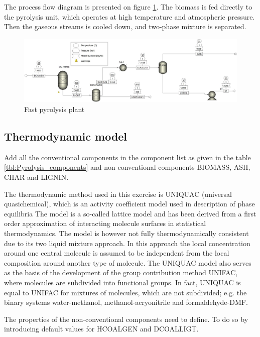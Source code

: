 The process flow diagram is presented on figure \ref{fig:Pyrolasis}. The biomass is fed directly to the pyrolysis unit, which operates at high temperature and atmospheric pressure. Then the gaseous streams is cooled down, and two-phase mixture is separated.

\begin{figure}[h!]
	\centering
	\includegraphics[width=\linewidth]{Figures/TchermochemicalProcesses/Pyrolysis.jpeg}
	\caption{Fast pyrolysis plant}
	\label{fig:Pyrolasis}
\end{figure}

\subsection{Thermodynamic model}
Add all the conventional components in the component list as given in the table \ref{tbl:Pyrolysis_components} and non-conventional components BIOMASS, ASH, CHAR and LIGNIN. 

The thermodynamic method used in this exercise is UNIQUAC (universal quasichemical), which is an activity coefficient model used in description of phase equilibria The model is a so-called lattice model and has been derived from a first order approximation of interacting molecule surfaces in statistical thermodynamics. The model is however not fully thermodynamically consistent due to its two liquid mixture approach. In this approach the local concentration around one central molecule is assumed to be independent from the local composition around another type of molecule. The UNIQUAC model also serves as the basis of the development of the group contribution method UNIFAC, where molecules are subdivided into functional groups. In fact, UNIQUAC is equal to UNIFAC for mixtures of molecules, which are not subdivided; e.g. the binary systems water-methanol, methanol-acryonitrile and formaldehyde-DMF. 

The properties of the non-conventional components need to define. To do so by introducing default values for HCOALGEN and DCOALLIGT.

